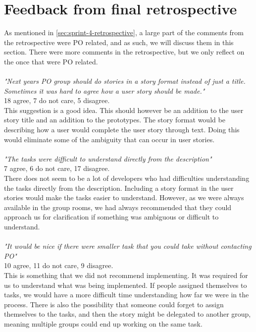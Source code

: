 \section{Feedback from final retrospective}\label{sec:retrospective-discussion}
As mentioned in \autoref{sec:sprint-4-retrospective}, a large part of the comments from the retrospective were PO related, and as such, we will discuss them in this section.
There were more comments in the retrospective, but we only reflect on the once that were PO related.
\\\\
\textit{"Next years PO group should do stories in a story format instead of just a title. Sometimes it was hard to agree how a user story should be made."}
\\
18 agree, 7 do not care, 5 disagree.
\\
This suggestion is a good idea. 
This should however be an addition to the user story title and an addition to the prototypes. 
The story format would be describing how a user would complete the user story through text. 
Doing this would eliminate some of the ambiguity that can occur in user stories.
\\\\
\textit{"The tasks were difficult to understand directly from the description"}
\\
7 agree, 6 do not care, 17 disagree.
\\
There does not seem to be a lot of developers who had difficulties understanding the tasks directly from the description. 
Including a story format in the user stories would make the tasks easier to understand.
However, as we were always available in the group rooms, we had always recommended that they could approach us for clarification if something was ambiguous or difficult to understand. 
\\\\
\textit{"It would be nice if there were smaller task that you could take without contacting PO"}
\\
10 agree, 11 do not care, 9 disagree.
\\
This is something that we did not recommend implementing. 
It was required for us to understand what was being implemented. 
If people assigned themselves to tasks, we would have a more difficult time understanding how far we were in the process.
There is also the possibility that someone could forget to assign themselves to the tasks, and then the story might be delegated to another group, meaning multiple groups could end up working on the same task.
